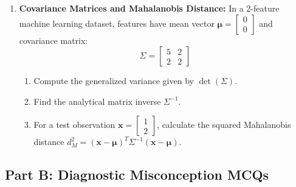 \begin{enumerate}
    \item \textbf{Covariance Matrices and Mahalanobis Distance:}
    In a 2-feature machine learning dataset, features have mean vector $\boldsymbol{\mu} = \begin{bmatrix} 0 \\ 0 \end{bmatrix}$ and covariance matrix:
    \begin{equation}
    \Sigma = \begin{bmatrix} 5 & 2 \\ 2 & 2 \end{bmatrix}
    \end{equation}
    \begin{enumerate}
        \item Compute the generalized variance given by $\det(\Sigma)$.
        \item Find the analytical matrix inverse $\Sigma^{-1}$.
        \item For a test observation $\mathbf{x} = \begin{bmatrix} 1 \\ 2 \end{bmatrix}$, calculate the squared Mahalanobis distance $d_M^2 = (\mathbf{x} - \boldsymbol{\mu})^T \Sigma^{-1} (\mathbf{x} - \boldsymbol{\mu})$.
    \end{enumerate}
\end{enumerate}

\subsection*{Part B: Diagnostic Misconception MCQs}

